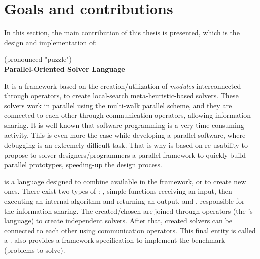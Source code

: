\section{Goals and contributions}

In this section, the \underline{main contribution} of this thesis is presented, which is the design and implementation of: 
\begin{center}
\posl{} (pronounced "puzzle")\\
\textbf{Parallel-Oriented Solver Language}
\end{center}
It is a framework based on the creation/utilization of \textit{modules} interconnected through operators, to create local-search meta-heuristic-based solvers. These solvers work in parallel using the multi-walk parallel scheme, and they are connected to each other through communication operators, allowing information sharing. It is well-known that software programming is a very time-consuming activity. This is even more the case while developing a parallel software, where debugging is an extremely difficult task. That is why \posl{} is based on re-usability to propose to \csp{} solver designers/programmers a parallel framework to quickly build parallel prototypes, speeding-up the design process.

\posl{} is a language designed to combine \ms{} available in the framework, or to create new ones. There exist two types of \ms{}: \oms{}, simple functions receiving an input, then executing an internal algorithm and returning an output, and \opchs{}, responsible for the information sharing.
The created/chosen \ms{} are joined through operators (the \posl's language) to create independent solvers. After that, created solvers can be connected to each other using communication operators. This final entity is called a \soset. \posl{} also provides a framework specification to implement the benchmark (problems to solve). %


